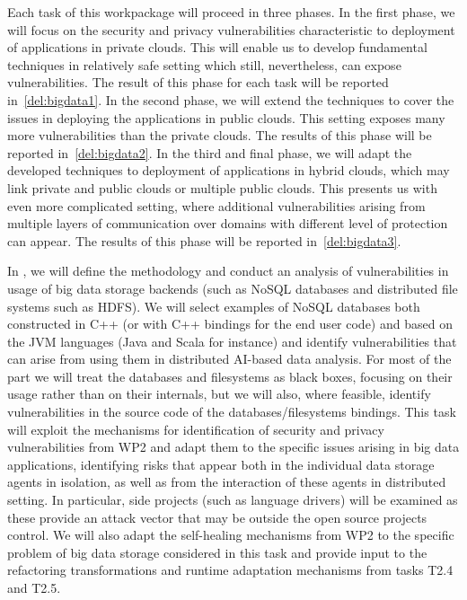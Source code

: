 \begin{Workpackage}{\thewpno}
\begin{WPDescription}
Each task of this workpackage will proceed in three phases. In the first phase, we will focus on the security and privacy vulnerabilities characteristic to deployment of applications in private clouds. This will enable us to develop fundamental techniques in relatively safe setting which still, nevertheless, can expose vulnerabilities. The result of this phase for each task will be reported in~\ref{del:bigdata1}. In the second phase, we will extend the techniques to cover the issues in deploying the applications in public clouds. This setting exposes many more vulnerabilities than the private clouds. The results of this phase will be reported in~\ref{del:bigdata2}. In the third and final phase, we will adapt the developed techniques to deployment of applications in hybrid clouds, which may link private and public clouds or multiple public clouds. This presents us with even more complicated setting, where additional vulnerabilities arising from multiple layers of communication over domains with different level of protection can appear. The results of this phase will be reported in~\ref{del:bigdata3}.
\end{WPDescription}

\begin{Task}

\TaskResults{%
\ref{del:bigdata1}
\ref{del:bigdata2}
\ref{del:bigdata3}
}
\TaskHeader{}
In \theTask, we will define the methodology and conduct an analysis of vulnerabilities in usage of big data storage backends (such as NoSQL databases and distributed file systems such as HDFS).  We will select examples of NoSQL databases both constructed in C++ (or with C++ bindings for the end user code) and based on the JVM languages (Java and Scala for instance) and identify vulnerabilities that can arise from using them in distributed AI-based data analysis. For most of the part we will treat the databases and filesystems as black boxes, focusing on their usage rather than on their internals, but we will also, where feasible, identify vulnerabilities in the source code of the databases/filesystems bindings. This task will exploit the mechanisms for identification of security and privacy vulnerabilities from WP2 and adapt them to the specific issues arising in big data applications, identifying risks that appear both in the individual data storage agents in isolation, as well as from the interaction of these agents in distributed setting. In particular, side projects (such as language drivers) will be examined as these provide an attack vector that may be outside the open source projects control. We will 
also adapt the self-healing mechanisms from WP2 to the specific problem of big data storage considered in this task and provide input to the refactoring transformations and runtime adaptation mechanisms from tasks T2.4 and T2.5. 
 

\end{Task}
\end{Workpackage}
